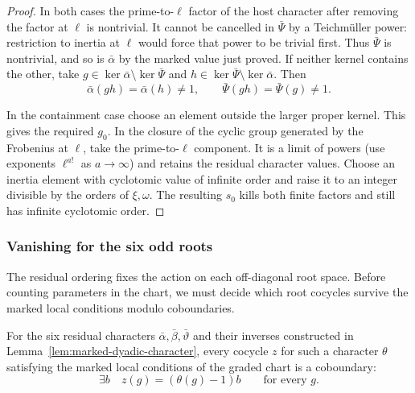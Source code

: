 \begin{proof}
In both cases the prime-to-\(\ell\) factor of the host character
after removing the factor at \(\ell\) is nontrivial. It cannot be
cancelled in \(\bar\Psi\) by a Teichm\"uller power: restriction
to inertia at \(\ell\) would force that power to be trivial first.
Thus \(\bar\Psi\) is nontrivial, and so is \(\bar\alpha\) by the
marked value just proved. If neither kernel contains the other, take
\(g\in\ker\bar\alpha\setminus\ker\bar\Psi\) and
\(h\in\ker\bar\Psi\setminus\ker\bar\alpha\). Then
\[
    \bar\alpha(gh)=\bar\alpha(h)\ne1,\qquad
    \bar\Psi(gh)=\bar\Psi(g)\ne1 .
\]

In the containment case choose an
element outside the larger proper kernel. This gives the required
\(g_0\).
In the closure of the cyclic group generated by the Frobenius at
\(\ell\), take the prime-to-\(\ell\) component. It is a limit of
powers (use exponents \(\ell^{a!}\) as \(a\to\infty\)) and retains
the residual character values. Choose an inertia element with
cyclotomic value of infinite order and raise it to an integer
divisible by the orders of \(\xi,\omega\). The resulting \(s_0\)
kills both finite factors and still has infinite cyclotomic order.

\end{proof}

\subsubsection{Vanishing for the six odd roots}

The residual ordering fixes the action on each off-diagonal root space. Before counting parameters in the chart, we must decide which root cocycles survive the marked local conditions modulo coboundaries.

\begin{proposition}\label{prop:six-odd-roots}
For the six residual characters
\(\bar\alpha,\bar\beta,\bar\vartheta\) and their inverses constructed
in Lemma~\ref{lem:marked-dyadic-character}, every cocycle \(z\) for such a character \(\theta\) satisfying the marked local conditions of the graded chart is a coboundary: 
\[
 \exists b\quad z(g)=(\theta(g)-1)b\qquad\text{for every }g.
\]

\end{proposition}

